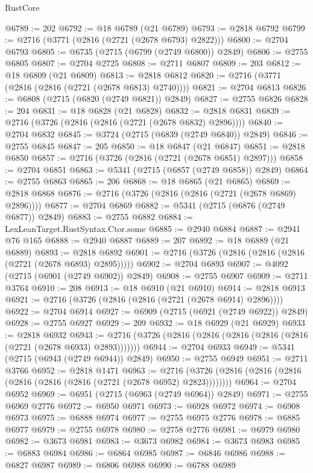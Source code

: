 \begin{lexlean}{RustCore}
\begin{coremodule}
@6789 := 202
@6792 := @18 @6789 (@21 @6789)
@6793 := @2818 @6792
@6799 := @2716 (@3771 (@2816 (@2721 (@2678 @6793) @2822)))
@6800 := @2704 @6793
@6805 := @6735 (@2715 (@6799 (@2749 @6800)) @2849)
@6806 := @2755 @6805
@6807 := @2704 @2725
@6808 := @2711 @6807
@6809 := 203
@6812 := @18 @6809 (@21 @6809)
@6813 := @2818 @6812
@6820 := @2716 (@3771 (@2816 (@2816 (@2721 (@2678 @6813) @2740))))
@6821 := @2704 @6813
@6826 := @6808 (@2715 (@6820 (@2749 @6821)) @2849)
@6827 := @2755 @6826
@6828 := 204
@6831 := @18 @6828 (@21 @6828)
@6832 := @2818 @6831
@6839 := @2716 (@3726 (@2816 (@2816 (@2721 (@2678 @6832) @2896))))
@6840 := @2704 @6832
@6845 := @3724 (@2715 (@6839 (@2749 @6840)) @2849)
@6846 := @2755 @6845
@6847 := 205
@6850 := @18 @6847 (@21 @6847)
@6851 := @2818 @6850
@6857 := @2716 (@3726 (@2816 (@2721 (@2678 @6851) @2897)))
@6858 := @2704 @6851
@6863 := @5341 (@2715 (@6857 (@2749 @6858)) @2849)
@6864 := @2755 @6863
@6865 := 206
@6868 := @18 @6865 (@21 @6865)
@6869 := @2818 @6868
@6876 := @2716 (@3726 (@2816 (@2816 (@2721 (@2678 @6869) @2896))))
@6877 := @2704 @6869
@6882 := @5341 (@2715 (@6876 (@2749 @6877)) @2849)
@6883 := @2755 @6882
@6884 := LexLeanTarget.RustSyntax.Ctor.some
@6885 := @2940 @6884
@6887 := @2941 @76 @165
@6888 := @2940 @6887
@6889 := 207
@6892 := @18 @6889 (@21 @6889)
@6893 := @2818 @6892
@6901 := @2716 (@3726 (@2816 (@2816 (@2816 (@2721 (@2678 @6893) @2895)))))
@6902 := @2704 @6893
@6907 := @4092 (@2715 (@6901 (@2749 @6902)) @2849)
@6908 := @2755 @6907
@6909 := @2711 @3764
@6910 := 208
@6913 := @18 @6910 (@21 @6910)
@6914 := @2818 @6913
@6921 := @2716 (@3726 (@2816 (@2816 (@2721 (@2678 @6914) @2896))))
@6922 := @2704 @6914
@6927 := @6909 (@2715 (@6921 (@2749 @6922)) @2849)
@6928 := @2755 @6927
@6929 := 209
@6932 := @18 @6929 (@21 @6929)
@6933 := @2818 @6932
@6943 := @2716 (@3726 (@2816 (@2816 (@2816 (@2816 (@2816 (@2721 (@2678 @6933) @2893)))))))
@6944 := @2704 @6933
@6949 := @5341 (@2715 (@6943 (@2749 @6944)) @2849)
@6950 := @2755 @6949
@6951 := @2711 @3766
@6952 := @2818 @1471
@6963 := @2716 (@3726 (@2816 (@2816 (@2816 (@2816 (@2816 (@2816 (@2721 (@2678 @6952) @2823))))))))
@6964 := @2704 @6952
@6969 := @6951 (@2715 (@6963 (@2749 @6964)) @2849)
@6971 := @2755 @6969 @2776
@6972 := @6950 @6971
@6973 := @6928 @6972
@6974 := @6908 @6973
@6975 := @6888 @6974
@6977 := @2755 @6975 @2776
@6978 := @6885 @6977
@6979 := @2755 @6978
@6980 := @2758 @2776
@6981 := @6979 @6980
@6982 := @3673 @6981
@6983 := @3673 @6982
@6984 := @3673 @6983
@6985 := @6883 @6984
@6986 := @6864 @6985
@6987 := @6846 @6986
@6988 := @6827 @6987
@6989 := @6806 @6988
@6990 := @6788 @6989

\end{coremodule}
\end{lexlean}
